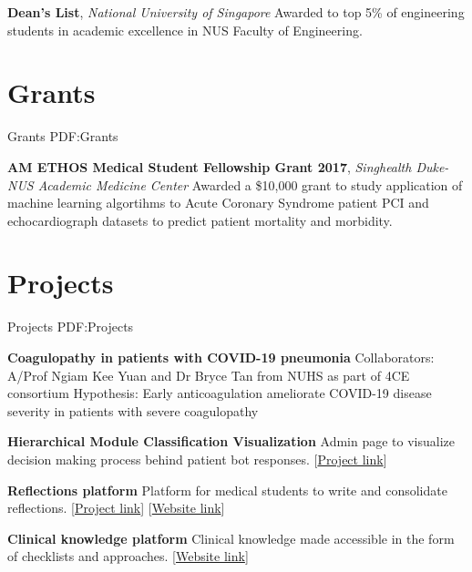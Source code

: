 \documentclass[letterpaper,10pt,oneside]{article}
\begin{document}
\begin{body}
\textbf{Dean's List}, \textit{National University of Singapore}
\hfill
{}
\BulletItem
Awarded to top 5\% of engineering students in academic excellence in NUS Faculty of Engineering.
\GapNoBreak


\section
{Grants}
{Grants}
{PDF:Grants}


\textbf{AM ETHOS Medical Student Fellowship Grant 2017},
\hfill{}
\GapNoBreak
\textit{Singhealth Duke-NUS Academic Medicine Center}
\GapNoBreak
\BulletItem
Awarded a \$10,000 grant to study application of machine learning algortihms to Acute Coronary Syndrome patient PCI and echocardiograph datasets to predict patient mortality and morbidity.
\GapNoBreak

\section
{Projects}
{Projects}
{PDF:Projects}

\textbf{Coagulopathy in patients with COVID-19 pneumonia}
\newline Collaborators: A/Prof Ngiam Kee Yuan and Dr Bryce Tan from NUHS as part of 4CE consortium
\newline Hypothesis: Early anticoagulation ameliorate COVID-19 disease severity in patients with severe coagulopathy
\GapNoBreak

\textbf{Hierarchical Module Classification Visualization}
\newline Admin page to visualize decision making process behind patient bot responses. [\href{https://github.com/llja0112/medbot-server-admin}{Project link}]
\GapNoBreak

\textbf{Reflections platform}
\newline Platform for medical students to write and consolidate reflections. [\href{https://github.com/llja0112/reflections}{Project link}] [\href{http://reflective.me}{Website link}]
\GapNoBreak

\textbf{Clinical knowledge platform}
\newline Clinical knowledge made accessible in the form of checklists and approaches. [\href{http:\\medbot.me}{Website link}]



\end{body}
\end{document}
